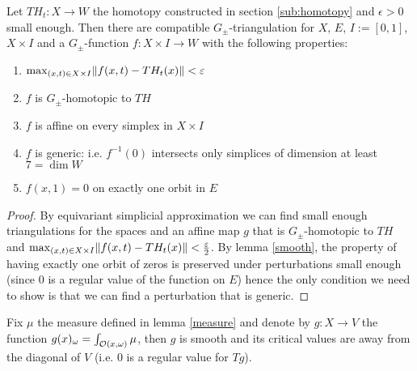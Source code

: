 \documentclass[9pt]{article}
\begin{document}
\begin{lemma}
  \label{generic}

  Let $TH_t: X \rightarrow W$ the homotopy constructed in section \ref{sub:homotopy} and $\epsilon > 0$ small enough. Then there are compatible $G_\pm$-triangulation for $X$, $E$, $I:=[0,1]$, $X\times I$ and a $G_\pm$-function $f:X\times I\rightarrow W$ with the following properties:
  \begin{enumerate}
  \item $\max_{(x,t)\in X\times I} \lVert f(x, t) - TH_t(x) \rVert < \varepsilon$
  \item $f$ is $G_\pm$-homotopic to $TH$
  \item $f$ is affine on every simplex in $X\times I$
  \item $f$ is generic: i.e. $f^{-1}(0)$ intersects only simplices of dimension at least $7=\dim W$
  \item $f(x,1) = 0$ on exactly one orbit in $E$ 
  \end{enumerate}
\end{lemma}

\begin{proof}
  By equivariant simplicial approximation we can find small enough triangulations for the spaces and an affine map $g$ that is $G_\pm$-homotopic to $TH$ and $\max_{(x,t)\in X\times I} \lVert f(x, t) - TH_t(x) \rVert < \frac{\varepsilon}{2}$.
  By lemma \ref{smooth}, the property of having exactly one orbit of zeros is preserved under perturbations small enough (since $0$ is a regular value of the function on $E$) hence the only condition we need to show is that we can find a perturbation that is generic.
\end{proof}

\begin{lemma}\label{smooth}
  Fix $\mu$ the measure defined in lemma \ref{measure} and denote by $g:X\rightarrow V$ the function $g(x)_\omega = \int_{\mathcal{O}(x, \omega)}\mu$, then $g$ is smooth and its critical values are away from the diagonal of $V$ (i.e. $0$ is a regular value for $Tg$).
\end{lemma}
\end{document}
